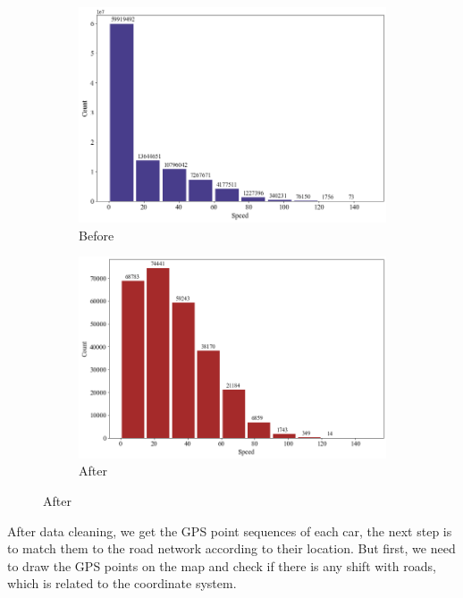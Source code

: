 \begin{figure}[htb]
  \centering
  \caption{Speed distribution before and after cleaning.}
  \label{fig: speed_distribution}
  \begin{subfigure}[t]{0.45\linewidth}
      \centering
      \includegraphics[width=\textwidth]{images/speed_hist_before.png}
      \caption{Before}
      \label{fig: speed_before}
  \end{subfigure}
  \begin{subfigure}[t]{0.45\linewidth}
      \centering
      \includegraphics[width=\textwidth]{images/speed_hist_after.png}
      \caption{After}
      \label{fig: speed_after}
  \end{subfigure}
\end{figure}

After data cleaning, we get the GPS point sequences of each car, the next step is to match them to the road network according to their location. But first, we need to draw the GPS points on the map and check if there is any shift with roads, which is related to the coordinate system.

